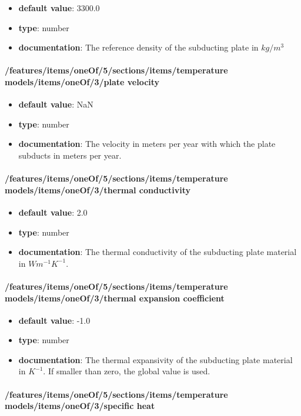 \begin{itemize}\item {\bf default value}: 3300.0
\item {\bf type}: number
\item {\bf documentation}: The reference density of the subducting plate in $kg/m^3$
\end{itemize}\paragraph{/features/items/oneOf/5/sections/items/temperature models/items/oneOf/3/plate velocity}
\begin{itemize}\item {\bf default value}: NaN
\item {\bf type}: number
\item {\bf documentation}: The velocity in meters per year with which the plate subducts in meters per year.
\end{itemize}\paragraph{/features/items/oneOf/5/sections/items/temperature models/items/oneOf/3/thermal conductivity}
\begin{itemize}\item {\bf default value}: 2.0
\item {\bf type}: number
\item {\bf documentation}: The thermal conductivity of the subducting plate material in $W m^{-1} K^{-1}$.
\end{itemize}\paragraph{/features/items/oneOf/5/sections/items/temperature models/items/oneOf/3/thermal expansion coefficient}
\begin{itemize}\item {\bf default value}: -1.0
\item {\bf type}: number
\item {\bf documentation}: The thermal expansivity of the subducting plate material in $K^{-1}$. If smaller than zero, the global value is used.
\end{itemize}\paragraph{/features/items/oneOf/5/sections/items/temperature models/items/oneOf/3/specific heat}
